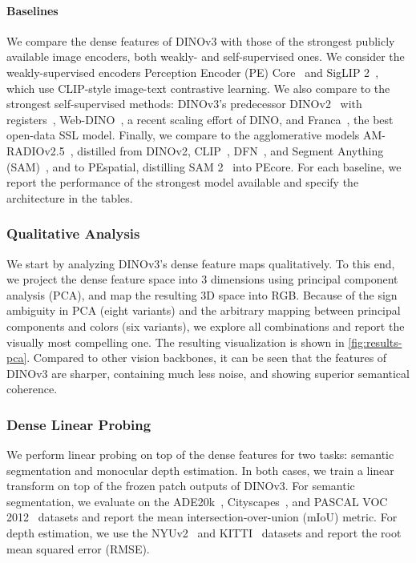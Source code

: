 \paragraph{Baselines}
We compare the dense features of DINOv3 with those of the strongest publicly available image encoders, both weakly- and self-supervised ones. 
We consider the weakly-supervised encoders Perception Encoder (PE) Core~\citep{bolya2025perception} and SigLIP 2~\citep{tschannen2025siglip}, which use CLIP-style image-text contrastive learning.
We also compare to the strongest self-supervised methods: DINOv3's predecessor DINOv2~\citep{oquab2024dinov2} with registers~\citep{darcet2024vision}, Web-DINO~\citep{fan2025scaling}, a recent scaling effort of DINO, and Franca~\citep{venkataramanan2025franca}, the best open-data SSL model.   %
Finally, we compare to the agglomerative models AM-RADIOv2.5~\citep{heinrich2025radiov25}, distilled from DINOv2, CLIP~\citep{radford2021learning}, DFN~\citep{fang2024data}, and Segment Anything (SAM)~\citep{kirillov2023segment}, and to PEspatial, distilling SAM 2~\citep{ravi2025sam} into PEcore.
For each baseline, we report the performance of the strongest model available and specify the architecture in the tables.

\subsubsection{Qualitative Analysis}
\label{sec:results-qualitative}
We start by analyzing DINOv3's dense feature maps qualitatively.
To this end, we project the dense feature space into 3 dimensions using principal component analysis (PCA), and map the resulting 3D space into RGB.
Because of the sign ambiguity in PCA (eight variants) and the arbitrary mapping between principal components and colors (six variants), we explore all combinations and report the visually most compelling one.
The resulting visualization is shown in \cref{fig:results-pca}.
Compared to other vision backbones, it can be seen that the features of DINOv3 are sharper, containing much less noise, and showing superior semantical coherence.



\subsubsection{Dense Linear Probing}
\label{sec:results-dense-linear-probing}

We perform linear probing on top of the dense features for two tasks: semantic segmentation and monocular depth estimation.
In both cases, we train a linear transform on top of the frozen patch outputs of DINOv3.
For semantic segmentation, we evaluate on the ADE20k~\citep{zhou2017scene}, Cityscapes~\citep{cordts2016cityscapes}, and PASCAL VOC 2012~\citep{pascal-voc-2012} datasets and report the mean intersection-over-union (mIoU) metric.
For depth estimation, we use the NYUv2~\citep{silberman2012indoor} and KITTI~\citep{geiger2013vision} datasets and report the root mean squared error (RMSE).

